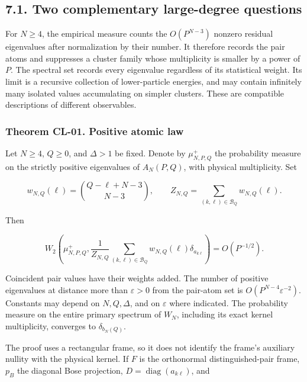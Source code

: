 \hypertarget{two-complementary-large-degree-questions}{%
\subsection{7.1. Two complementary large-degree questions}\label{two-complementary-large-degree-questions}}

For \(N\geq4\), the empirical measure counts the \(O(P^{N-3})\) nonzero residual eigenvalues after normalization by their number. It therefore records the pair atoms and suppresses a cluster family whose multiplicity is smaller by a power of \(P\). The spectral set records every eigenvalue regardless of its statistical weight. Its limit is a recursive collection of lower-particle energies, and may contain infinitely many isolated values accumulating on simpler clusters. These are compatible descriptions of different observables.

\hypertarget{theorem-cl-01.-positive-atomic-law}{%
\subsubsection{Theorem CL-01. Positive atomic law}\label{theorem-cl-01.-positive-atomic-law}}

Let \(N\geq4\), \(Q\geq0\), and \(\Delta>1\) be fixed. Denote by \(\mu^+_{N,P,Q}\) the probability measure on the strictly positive eigenvalues of \(A_N(P,Q)\), with physical multiplicity. Set

\[
w_{N,Q}(\ell)=\binom{Q-\ell+N-3}{N-3},\qquad
 Z_{N,Q}=\sum_{(k,\ell)\in\mathcal B_Q}w_{N,Q}(\ell).
\]

Then

\[
W_2\!\left(\mu^+_{N,P,Q},\frac1{Z_{N,Q}}
\sum_{(k,\ell)\in\mathcal B_Q}w_{N,Q}(\ell)\delta_{a_{k\ell}}\right)
=O(P^{-1/2}).
\tag{CL.2}
\]

Coincident pair values have their weights added. The number of positive eigenvalues at distance more than \(\varepsilon>0\) from the pair-atom set is \(O(P^{N-4}\varepsilon^{-2})\). Constants may depend on \(N,Q,\Delta\), and on \(\varepsilon\) where indicated. The probability measure on the entire primary spectrum of \(W_N\), including its exact kernel multiplicity, converges to \(\delta_{b_N(Q)}\).

The proof uses a rectangular frame, so it does not identify the frame's auxiliary nullity with the physical kernel. If \(F\) is the orthonormal distinguished-pair frame, \(p_B\) the diagonal Bose projection, \(D=\operatorname{diag}(a_{k\ell})\), and

